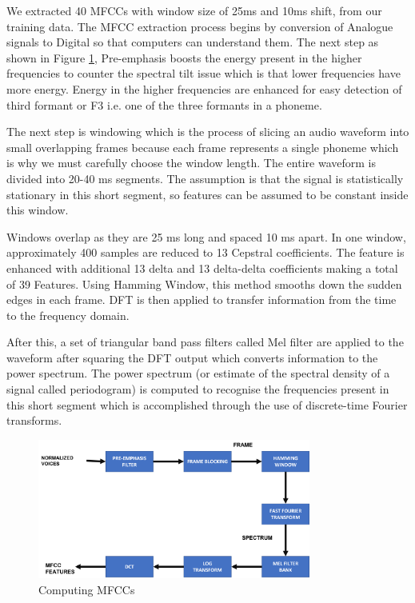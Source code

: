\documentclass[lettersize,journal]{IEEEtran}
\begin{document}
We extracted 40 MFCCs with  window size of 25ms and 10ms shift, from our training data. The MFCC extraction process begins by conversion of Analogue signals to Digital so that computers can understand them. The next step as shown in Figure \ref{fig:MFCCs-computation}, Pre-emphasis boosts the energy present in the higher frequencies to counter the spectral tilt issue which is that lower frequencies have more energy. Energy in the higher frequencies are enhanced for easy detection of third formant or F3 i.e. one of the three formants in a phoneme. 

The next step is windowing which is the process of slicing an audio waveform into small overlapping frames because each frame represents a single phoneme which is why we must carefully choose the window length. The entire waveform is divided into 20-40 ms segments. The assumption is that the signal is statistically stationary in this short segment, so features can be assumed to be constant inside this window. %

Windows overlap as they are 25 ms long and spaced 10 ms apart. In one window, approximately 400 samples are reduced to 13 Cepstral coefficients. The feature is enhanced with additional 13 delta and 13 delta-delta coefficients making a total of 39 Features. Using Hamming Window, this method smooths down the sudden edges in each frame. DFT is then applied to transfer information from the time to the frequency domain. 

After this, a set of triangular band pass filters called Mel filter are applied to the waveform after squaring the DFT output which converts information to the power spectrum. The power spectrum (or estimate of the spectral density of a signal called periodogram) is computed to recognise the frequencies present in this short segment which is accomplished through the use of discrete-time Fourier transforms.   

\begin{figure}[h]
    \centering
    \includegraphics[width=0.8\textwidth]{img/feature extraction.png}
    \caption{Computing MFCCs}
    \label{fig:MFCCs-computation}
\end{figure}
\end{document}
